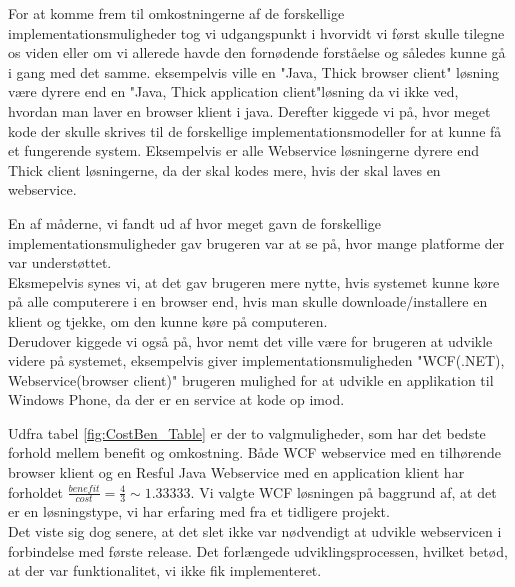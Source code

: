 For at komme frem til omkostningerne af de forskellige implementationsmuligheder tog vi udgangspunkt i hvorvidt vi først skulle tilegne os viden eller om vi allerede havde den fornødende forståelse og således kunne gå i gang med det samme. eksempelvis ville en "Java, Thick browser client" løsning være dyrere end en "Java, Thick application client"løsning da vi ikke ved, hvordan man laver en browser klient i java. Derefter kiggede vi på, hvor meget kode der skulle skrives til de forskellige implementationsmodeller for at kunne få et fungerende system. Eksempelvis er alle Webservice løsningerne dyrere end Thick client løsningerne, da der skal kodes mere, hvis der skal laves en webservice.

En af måderne, vi fandt ud af hvor meget gavn de forskellige implementationsmuligheder gav brugeren var at se på, hvor mange platforme der var understøttet.
\\Eksmepelvis synes vi, at det gav brugeren mere nytte, hvis systemet kunne køre på alle computerere i en browser end, hvis man skulle downloade/installere en klient og tjekke, om den kunne køre på computeren.
\\Derudover kiggede vi også på, hvor nemt det ville være for brugeren at udvikle videre på systemet, eksempelvis giver implementationsmuligheden "WCF(.NET), Webservice(browser client)" brugeren mulighed for at udvikle en applikation til Windows Phone, da der er en service at kode op imod.

Udfra tabel \ref{fig:CostBen_Table} er der to valgmuligheder, som har det bedste forhold mellem benefit og omkostning. Både WCF webservice med en tilhørende browser klient og en Resful Java Webservice med en application klient har forholdet \begin{math}\frac{benefit}{cost} = \frac{4}{3} \sim 1.33333\end{math}. Vi valgte WCF løsningen på baggrund af, at det er en løsningstype, vi har erfaring med fra et tidligere projekt.
\\Det viste sig dog senere, at det slet ikke var nødvendigt at udvikle webservicen i forbindelse med første release. Det forlængede udviklingsprocessen, hvilket betød, at der var funktionalitet, vi ikke fik implementeret.